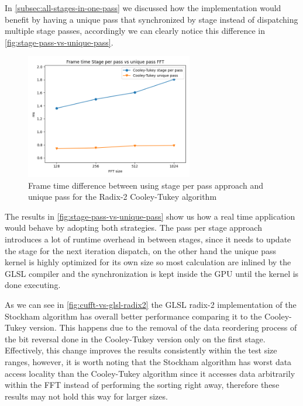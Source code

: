 \documentclass[
  oneside,
  11pt, a4paper,
  footinclude=true,
  headinclude=true,
  cleardoublepage=empty
]{scrbook}
\begin{document}
In \autoref{subsec:all-stages-in-one-pass} we discussed how the implementation would benefit by having a unique pass that synchronized by stage instead of dispatching multiple stage passes, accordingly we can clearly notice this difference in \autoref{fig:stage-pass-vs-unique-pass}.

\begin{figure}[h] 
    \centering
    \includegraphics[width=0.65\textwidth]{img/results/glsl_stage_pass_vs_unique_pass.png}
    \caption{Frame time difference between using stage per pass approach and unique pass for the Radix-2 Cooley-Tukey algorithm}
    \label{fig:stage-pass-vs-unique-pass}
\end{figure}

The results in \autoref{fig:stage-pass-vs-unique-pass} show us how a real time application would behave by adopting both strategies. The pass per stage approach introduces a lot of runtime overhead in between stages, since it needs to update the stage for the next iteration dispatch, on the other hand the unique pass kernel is highly optimized for its own size so most calculation are inlined by the GLSL compiler and the synchronization is kept inside the GPU until the kernel is done executing.
\newline

As we can see in \autoref{fig:cufft-vs-glsl-radix2} the GLSL radix-2 implementation of the Stockham algorithm has overall better performance comparing it to the Cooley-Tukey version. This happens due to the removal of the data reordering process of the bit reversal done in the Cooley-Tukey version only on the first stage. Effectively, this change improves the results consistently within the test size ranges, however, it is worth noting that the Stockham algorithm has worst data access locality than the Cooley-Tukey algorithm since it accesses data arbitrarily within the FFT instead of performing the sorting right away, therefore these results may not hold this way for larger sizes.
\end{document}
